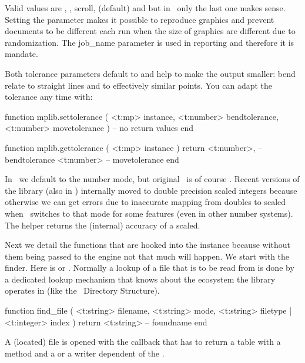 Valid  values are , , \type
{scroll},  (default) and  but in \CONTEXT\ only
the last one makes sense. Setting the  parameter makes it
possible to reproduce graphics and prevent documents to be different each run
when the size of graphics are different due to randomization. The \type
{job_name} parameter is used in reporting and therefore it is mandate.

Both tolerance parameters default to  and help to make the output smaller: \quote
{bend} relate to straight lines and  to effectively similar points.
You can adapt the tolerance any time with:

\starttyping[option=LUA]
function mplib.settolerance (
    <t:mp>     instance,
    <t:number> bendtolerance,
    <t:number> movetolerance
)
    -- no return values
end
\stoptyping

\starttyping[option=LUA]
function mplib.gettolerance ( <t:mp> instance )
    return
        <t:number>, -- bendtolerance
        <t:number>  -- movetolerance
end
\stoptyping

In \CONTEXT\ we default to the  number mode, but original
\METAPOST\ is of course . Recent versions of the library (also in
\LUATEX) internally moved to double precision scaled integers because otherwise
we can get errors due to inaccurate mapping from doubles to scaled when
\METAPOST\ switches to that mode for some features (even in other number
systems). The  helper returns the (internal) accuracy of a
scaled.

Next we detail the functions that are hooked into the instance because without
them being passed to the engine not that much will happen. We start with the
finder. Here  is  or . Normally a lookup of a file
that is to be read from is done by a dedicated lookup mechanism that knows about
the ecosystem the library operates in (like the \TEX\ Directory Structure).

\starttyping[option=LUA]
function find_file (
    <t:string> filename,
    <t:string> mode,
    <t:string> filetype | <t:integer> index
)
    return <t:string> -- foundname
end
\stoptyping


A (located) file is opened with the  callback that has to
return a table with a  method and a  or a \type
{writer} dependent of the .

